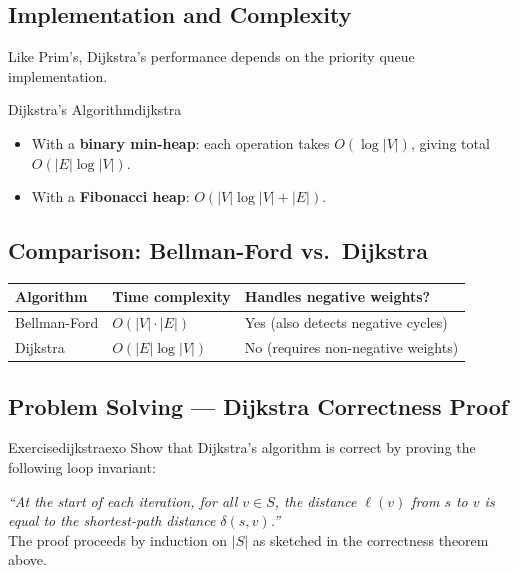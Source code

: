 \subsection{Implementation and Complexity}

Like Prim's, Dijkstra's performance depends on the priority queue implementation.

\begin{complexity}{Dijkstra's Algorithm}{dijkstra}
\begin{itemize}[noitemsep]
  \item With a \textbf{binary min-heap}: each operation takes $O(\log |V|)$, giving total
        $O(|E| \log |V|)$.
  \item With a \textbf{Fibonacci heap}: $O(|V| \log |V| + |E|)$.
\end{itemize}
\end{complexity}

\subsection{Comparison: Bellman-Ford vs.\ Dijkstra}

\begin{center}
\begin{tabular}{lll}
\toprule
\textbf{Algorithm} & \textbf{Time complexity} & \textbf{Handles negative weights?} \\
\midrule
Bellman-Ford & $O(|V| \cdot |E|)$ & Yes (also detects negative cycles) \\
Dijkstra     & $O(|E| \log |V|)$  & No (requires non-negative weights) \\
\bottomrule
\end{tabular}
\end{center}

\subsection{Problem Solving — Dijkstra Correctness Proof}

\begin{remark}{Exercise}{dijkstraexo}
Show that Dijkstra's algorithm is correct by proving the following loop invariant:

\medskip
\textit{``At the start of each iteration, for all $v \in S$, the distance $\ell(v)$ from $s$
to $v$ is equal to the shortest-path distance $\delta(s,v)$.''} \\

The proof proceeds by induction on $|S|$ as sketched in the correctness theorem above.
\end{remark}

